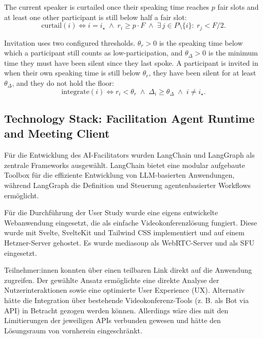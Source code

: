 The current speaker is curtailed once their speaking time reaches \(p\) fair slots and at least
one other participant is still below half a fair slot:
\begin{equation}
  \mathrm{curtail}(i)
  \iff
  i = i_{\star}
  \;\land\;
  r_i \ge p \cdot F
  \;\land\;
  \exists\, j \in P\setminus\{i\}:\ r_j < F/2.
  \label{eq:balancer-curtail}
\end{equation}

Invitation uses two configured thresholds. \(\theta_r>0\) is the speaking time below which a
participant still counts as low-participation, and \(\theta_{\Delta}>0\) is the minimum time they
must have been silent since they last spoke. A participant is invited in when their own
speaking time is still below \(\theta_r\), they have been silent for at least \(\theta_{\Delta}\),
and they do not hold the floor:
\begin{equation}
  \mathrm{integrate}(i)
  \iff
  r_i < \theta_r
  \;\land\;
  \Delta_i \ge \theta_{\Delta}
  \;\land\;
  i \neq i_{\star}.
  \label{eq:balancer-integrate}
\end{equation}

\subsection{Technology Stack: Facilitation Agent Runtime and Meeting Client}

Für die Entwicklung des AI-Facilitators wurden LangChain und LangGraph als zentrale Frameworks ausgewählt.
LangChain bietet eine modular aufgebaute Toolbox für die effiziente Entwicklung von LLM-basierten
Anwendungen, während LangGraph die Definition und Steuerung agentenbasierter Workflows ermöglicht.

Für die Durchführung der User Study wurde eine eigens entwickelte Webanwendung eingesetzt, die als einfache
Videokonferenzlösung fungiert. Diese wurde mit Svelte, SvelteKit und Tailwind CSS implementiert und auf einem
Hetzner-Server gehostet. Es wurde mediasoup als WebRTC-Server und als SFU eingesetzt.

Teilnehmer:innen konnten über einen teilbaren Link direkt auf die Anwendung zugreifen.
Der gewählte Ansatz ermöglichte eine direkte Analyse der Nutzerinteraktionen sowie eine optimierte User
Experience (UX). Alternativ hätte die Integration über bestehende Videokonferenz-Tools (z. B. als Bot via
API) in Betracht gezogen werden können. Allerdings wäre dies mit den Limitierungen der jeweiligen APIs
verbunden gewesen und hätte den Lösungsraum von vornherein eingeschränkt.

